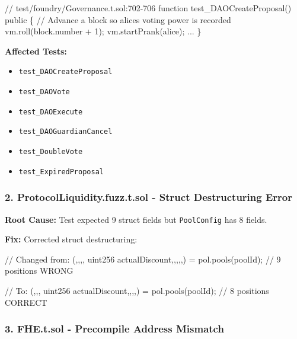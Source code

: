 \documentclass[
]{article}
\newenvironment{Shaded}{}{}
\newcommand{\NormalTok}[1]{#1}
\providecommand{\tightlist}{%
  \setlength{\itemsep}{0pt}\setlength{\parskip}{0pt}}
\begin{document}
\begin{Shaded}
\begin{Highlighting}[]
\NormalTok{// test/foundry/Governance.t.sol:702{-}706}
\NormalTok{function test\_DAOCreateProposal() public \{}
\NormalTok{    // Advance a block so alice\textquotesingle{}s voting power is recorded}
\NormalTok{    vm.roll(block.number + 1);}
\NormalTok{    vm.startPrank(alice);}
\NormalTok{    ...}
\NormalTok{\}}
\end{Highlighting}
\end{Shaded}

\textbf{Affected Tests:}

\begin{itemize}
\tightlist
\item
  \texttt{test\_DAOCreateProposal}
\item
  \texttt{test\_DAOVote}
\item
  \texttt{test\_DAOExecute}
\item
  \texttt{test\_DAOGuardianCancel}
\item
  \texttt{test\_DoubleVote}
\item
  \texttt{test\_ExpiredProposal}
\end{itemize}

\subsubsection{2. ProtocolLiquidity.fuzz.t.sol - Struct Destructuring
Error}\label{2-protocolliquidityfuzztsol---struct-destructuring-error}

\textbf{Root Cause:} Test expected 9 struct fields but
\texttt{PoolConfig} has 8 fields.

\textbf{Fix:} Corrected struct destructuring:

\begin{Shaded}
\begin{Highlighting}[]
\NormalTok{// Changed from:}
\NormalTok{(,,,, uint256 actualDiscount,,,,,) = pol.pools(poolId);  // 9 positions WRONG}

\NormalTok{// To:}
\NormalTok{(,,, uint256 actualDiscount,,,,) = pol.pools(poolId);  // 8 positions CORRECT}
\end{Highlighting}
\end{Shaded}

\subsubsection{3. FHE.t.sol - Precompile Address
Mismatch}\label{3-fhetsol---precompile-address-mismatch}
\end{document}
